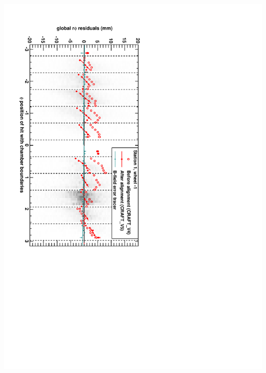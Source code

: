 \documentclass[compress]{beamer}
\begin{document}
\begin{frame}
\begin{minipage}{\linewidth}
\begin{columns}
\includegraphics[height=1.1\linewidth, angle=90]{alignmentplots_example2.pdf}

\vspace{0.3 cm}
\end{columns}
\end{minipage}
\end{frame}
\end{document}
